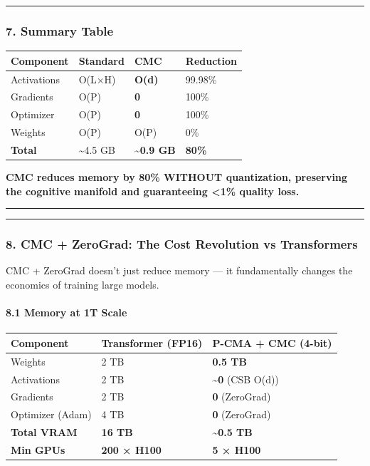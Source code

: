 \documentclass[
  11pt,
  a4paper,
]{article}
\begin{document}
\begin{center}\rule{0.5\linewidth}{0.5pt}\end{center}

\subsubsection{7. Summary Table}\label{summary-table}

\begin{longtable}[]{@{}llll@{}}
\toprule\noalign{}
Component & Standard & CMC & Reduction \\
\midrule\noalign{}
\endhead
\bottomrule\noalign{}
\endlastfoot
Activations & O(L×H) & \textbf{O(d)} & 99.98\% \\
Gradients & O(P) & \textbf{0} & 100\% \\
Optimizer & O(P) & \textbf{0} & 100\% \\
Weights & O(P) & O(P) & 0\% \\
\textbf{Total} & \textasciitilde4.5 GB & \textbf{\textasciitilde0.9 GB}
& \textbf{80\%} \\
\end{longtable}

\textbf{CMC reduces memory by 80\% WITHOUT quantization, preserving the
cognitive manifold and guaranteeing \textless1\% quality loss.}

\begin{center}\rule{0.5\linewidth}{0.5pt}\end{center}

\begin{center}\rule{0.5\linewidth}{0.5pt}\end{center}

\subsubsection{8. CMC + ZeroGrad: The Cost Revolution vs
Transformers}\label{cmc-zerograd-the-cost-revolution-vs-transformers}

CMC + ZeroGrad doesn't just reduce memory --- it fundamentally changes
the economics of training large models.

\paragraph{8.1 Memory at 1T Scale}\label{memory-at-1t-scale}

\begin{longtable}[]{@{}lll@{}}
\toprule\noalign{}
Component & Transformer (FP16) & P-CMA + CMC (4-bit) \\
\midrule\noalign{}
\endhead
\bottomrule\noalign{}
\endlastfoot
Weights & 2 TB & \textbf{0.5 TB} \\
Activations & 2 TB & \textbf{\textasciitilde0} (CSB O(d)) \\
Gradients & 2 TB & \textbf{0} (ZeroGrad) \\
Optimizer (Adam) & 4 TB & \textbf{0} (ZeroGrad) \\
\textbf{Total VRAM} & \textbf{16 TB} & \textbf{\textasciitilde0.5 TB} \\
\textbf{Min GPUs} & \textbf{200 × H100} & \textbf{5 × H100} \\
\end{longtable}
\end{document}
